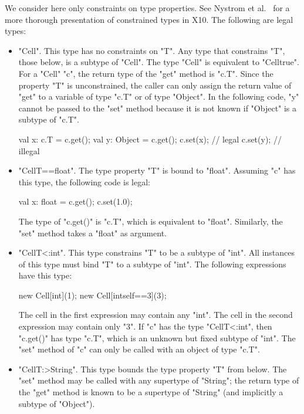 \documentclass[preprint,nocopyrightspace,9pt]{sigplanconf}
\begin{document}
We consider here only constraints on type properties.
See Nystrom et al.~\cite{constrained-types} for a more thorough
presentation of constrained types in X10.
The following are legal types:
\begin{itemize}
\item \xcd"Cell".  This type has no constraints on \xcd"T".
Any type that constrains \xcd"T", those below,
is a subtype of \xcd"Cell".  The type \xcd"Cell" is equivalent to
\xcd"Cell{true}".
%
For a \xcd"Cell" \xcd"c", the return type of the \xcd"get" method
is \xcd"c.T".
Since the property \xcd"T" is unconstrained,
the caller can only assign the return value of \xcd"get"
to a variable of type \xcd"c.T" or of type \xcd"Object".
In the following code, \xcd"y" cannot be passed to the \xcd"set" method
because it is not known if \xcd"Object" is a subtype of \xcd"c.T".
\begin{xten}
val x: c.T = c.get();
val y: Object = c.get();
c.set(x); // legal
c.set(y); // illegal
\end{xten}

\item \xcd"Cell{T==float}".
The type property \xcd"T" is bound to \xcd"float".
Assuming \xcd"c" has this type, the following code is legal:
\begin{xten}
val x: float = c.get();
c.set(1.0);
\end{xten}
The type of \xcd"c.get()" is \xcd"c.T", which is equivalent to
\xcd"float".
Similarly, the \xcd"set" method takes a \xcd"float" as argument.

\item \xcd"Cell{T<:int}".
This type constrains \xcd"T" to be a subtype of \xcd"int".
All instances of this type must bind \xcd"T" to a subtype of \xcd"int".
The following expressions have this type:
\begin{xten}
new Cell[int](1);
new Cell[int{self==3}](3);
\end{xten}
The cell in the first expression may contain any \xcd"int".
The cell in the second expression may contain only \xcd"3".
%
If \xcd"c" has the type \xcd"Cell{T<:int}",
then \xcd"c.get()" has type \xcd"c.T", which is an unknown but
fixed subtype of \xcd"int".  The \xcd"set" method of \xcd"c" can
only be called with an object of type \xcd"c.T".

\item \xcd"Cell{T:>String}".  This type bounds the type property
\xcd"T"
from below.  The \xcd"set" method may be called with any
supertype of \xcd"String"; the return type of the \xcd"get"
method is known to be a
supertype of \xcd"String" (and implicitly a subtype of \xcd"Object").
\end{itemize}
\end{document}
